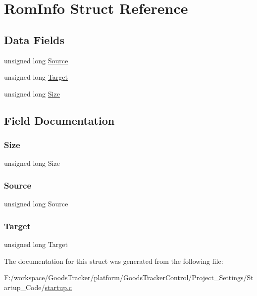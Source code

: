 \hypertarget{struct_rom_info}{}\section{Rom\+Info Struct Reference}
\label{struct_rom_info}
\subsection*{Data Fields}
\begin{DoxyCompactItemize}
\item 
unsigned long \hyperlink{struct_rom_info_af5d4fee8646e6d4952760547eb82bf5f}{Source}
\item 
unsigned long \hyperlink{struct_rom_info_a90712ef7a9dd839512df481e15f0d981}{Target}
\item 
unsigned long \hyperlink{struct_rom_info_adc25a45dd4fc0985b33c968068f749c4}{Size}
\end{DoxyCompactItemize}


\subsection{Field Documentation}
\mbox{\label{struct_rom_info_adc25a45dd4fc0985b33c968068f749c4}} 
\subsubsection{\texorpdfstring{Size}{Size}}
{\footnotesize\ttfamily unsigned long Size}

\mbox{\label{struct_rom_info_af5d4fee8646e6d4952760547eb82bf5f}} 
\subsubsection{\texorpdfstring{Source}{Source}}
{\footnotesize\ttfamily unsigned long Source}

\mbox{\label{struct_rom_info_a90712ef7a9dd839512df481e15f0d981}} 
\subsubsection{\texorpdfstring{Target}{Target}}
{\footnotesize\ttfamily unsigned long Target}



The documentation for this struct was generated from the following file\+:\begin{DoxyCompactItemize}
\item 
F\+:/workspace/\+Goods\+Tracker/platform/\+Goods\+Tracker\+Control/\+Project\+\_\+\+Settings/\+Startup\+\_\+\+Code/\hyperlink{startup_8c}{startup.\+c}\end{DoxyCompactItemize}

